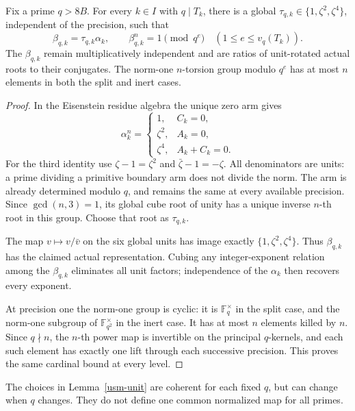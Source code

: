 \begin{lemma}
\label{usm-unit}
Fix a prime \(q>8B\). For every \(k\in I\) with \(q\mid T_k\), there
is a global \(\tau_{q,k}\in\{1,\zeta^2,\zeta^4\}\), independent of
the precision, such that
\[
 \beta_{q,k}=\tau_{q,k}\alpha_k,\qquad
 \beta_{q,k}^n=1\pmod {q^e}\quad(1\leq e\leq v_q(T_k)).
\]
The \(\beta_{q,k}\) remain multiplicatively independent and are
ratios of unit-rotated actual roots to their conjugates. The
norm-one \(n\)-torsion group modulo \(q^e\) has at most \(n\)
elements in both the split and inert cases.
\end{lemma}
\begin{proof}
In the Eisenstein residue algebra the unique zero arm gives
\[
 \alpha_k^n=
 \begin{cases}
 1,&C_k=0,\\
 \zeta^2,&A_k=0,\\
 \zeta^4,&A_k+C_k=0.
 \end{cases}
\]
For the third identity use \(\zeta-1=\zeta^2\) and
\(\bar\zeta-1=-\zeta\). All denominators are units: a prime dividing
a primitive boundary arm does not divide the norm. The arm is
already determined modulo \(q\), and remains the same at every
available precision. Since \(\gcd(n,3)=1\), its global cube root
of unity has a unique inverse \(n\)-th root in this group. Choose
that root as \(\tau_{q,k}\).

The map \(v\mapsto v/\bar v\) on the six global units has image
exactly \(\{1,\zeta^2,\zeta^4\}\). Thus \(\beta_{q,k}\) has the
claimed actual representation. Cubing any integer-exponent
relation among the \(\beta_{q,k}\) eliminates all unit factors;
independence of the \(\alpha_k\) then recovers every exponent.

At precision one the norm-one group is cyclic: it is
\(\mathbb F_q^\times\) in the split case, and the norm-one subgroup
of \(\mathbb F_{q^2}^\times\) in the inert case. It has at most
\(n\) elements killed by \(n\). Since \(q\nmid n\), the \(n\)-th
power map is invertible on the principal \(q\)-kernels, and each
such element has exactly one lift through each successive
precision. This proves the same cardinal bound at every level.
\end{proof}
The choices in Lemma~\ref{usm-unit} are coherent for each fixed
\(q\), but can change when \(q\) changes. They do not define one
common normalized map for all primes.

